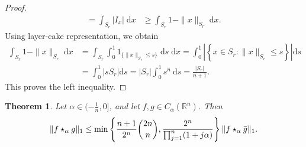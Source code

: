 \documentclass[11pt]{amsart}
\newcommand{\R}{{\mathbb R}}
\theoremstyle{plain}
\newtheorem{theorem}{Theorem}[section]
\theoremstyle{definition}
\theoremstyle{remark}
\begin{document}
\begin{proof}
$$\begin{aligned}
=\int_{S_r}\left|I_x\right|  \;\mathrm{d} x
& \geq \int_{S_r}1-\|x\|_{S_r}  \;\mathrm{d} x.
\end{aligned}
$$
Using layer-cake representation, we obtain
\begin{align}
\int_{S_r}1-\|x\|_{S_r}  \;\mathrm{d} x &= \int_{S_r}\int_0^1 {1}_{\{\|x\|_{S_r}  \leq s\}} \;\mathrm{d} s \;\mathrm{d} x
 =\int_0^1\left|\left\{x \in S_r: \|x\|_{S_r}  \leq s\right\}\right| \mathrm{d} s \\
& =\int_0^1\left|s S_r\right| \mathrm{d} s
 =\left|S_r\right| \int_0^1 s^n \mathrm{~d} s
 =\frac{\left|S_r\right|}{n+1}.
\end{align}
This proves the left inequality.
\end{proof}

\begin{theorem}
    \label{prop:litvak-fun}
    Let $\alpha \in (-\frac{1}{n},0]$, and let $f,g \in C_{\alpha}(\R^n)$. Then
    \begin{equation} \label{eq:Litvak-alpha}
        \| f \star_\alpha g\|_1 \leq \min \left\{\frac{n+1}{2^n}\binom{2 n}{n},\frac{2^n}{\prod_{j=1}^n(1+j \alpha)} \right\} \| f \star_\alpha \Bar{g}\|_1.
    \end{equation}
\end{theorem}
\end{document}
